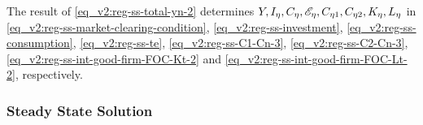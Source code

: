 \documentclass[../thesis.tex]{subfiles}
\begin{document}

	The result of \ref{eq_v2:reg-ss-total-yn-2} determines $Y, I_{\eta}, C_{\eta}, \te[],  C_{\eta 1}, C_{\eta 2}, K_{\eta}, L_{\eta}$ in \ref{eq_v2:reg-ss-market-clearing-condition}, \ref{eq_v2:reg-ss-investment}, \ref{eq_v2:reg-ss-consumption}, \ref{eq_v2:reg-ss-te},  \ref{eq_v2:reg-ss-C1-Cn-3}, \ref{eq_v2:reg-ss-C2-Cn-3}, \ref{eq_v2:reg-ss-int-good-firm-FOC-Kt-2} and \ref{eq_v2:reg-ss-int-good-firm-FOC-Lt-2}, respectively.


	
	
	\subsubsection{Steady State Solution}
	
	\vspace*{-1cm}
\end{document}
